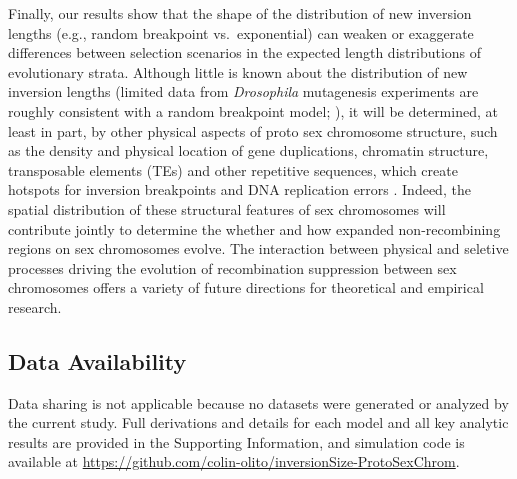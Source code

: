 \documentclass{article}[12pt]
\begin{document}

Finally, our results show that the shape of the distribution of new inversion lengths (e.g., random breakpoint vs.~exponential) can weaken or exaggerate differences between selection scenarios in the expected length distributions of evolutionary strata. Although little is known about the distribution of new inversion lengths (limited data from {\itshape Drosophila} mutagenesis experiments are roughly consistent with a random breakpoint model; \citealt{KrimbasPowell1992}), it will be determined, at least in part, by other physical aspects of proto sex chromosome structure, such as the density and physical location of gene duplications, chromatin structure, transposable elements (TEs) and other repetitive sequences, which create hotspots for inversion breakpoints and DNA replication errors \citep[e.g.,][]{Charlesworth1994, PevznerTesler2003, PengPevznerTesler2006, LeeBatzer2008}. Indeed, the spatial distribution of these structural features of sex chromosomes will contribute jointly to determine the whether and how expanded non-recombining regions on sex chromosomes evolve. The interaction between physical and seletive processes driving the evolution of recombination suppression between sex chromosomes offers a variety of future directions for theoretical and empirical research.


\subsection*{Data Availability}
Data sharing is not applicable because no datasets were generated or analyzed by the current study. Full derivations and details for each model and all key analytic results are provided in the Supporting Information, and simulation code is available at \url{https://github.com/colin-olito/inversionSize-ProtoSexChrom}.
\end{document}
